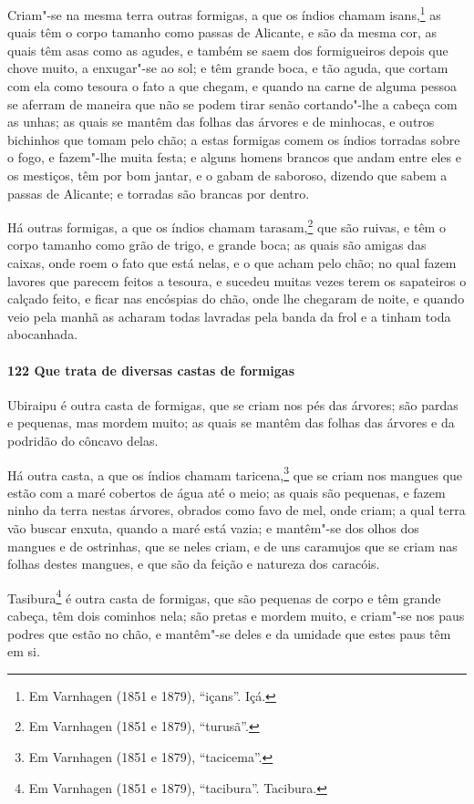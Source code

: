 \begin{linenumbers}
Criam"-se na mesma terra outras formigas, a que os índios chamam isans,\footnote{ Em
Varnhagen (1851 e 1879), ``içans''. Içá.} as quais têm o corpo tamanho como passas de
Alicante, e são da mesma cor, as quais têm asas como as agudes, e também se saem dos
formigueiros depois que chove muito, a enxugar"-se ao sol; e têm grande boca, e tão aguda,
que cortam com ela como tesoura o fato a que chegam, e quando na carne de alguma pessoa se
aferram de maneira que não se podem tirar senão cortando"-lhe a cabeça com as unhas; as
quais se mantêm das folhas das árvores e de minhocas, e outros bichinhos que tomam pelo
chão; a estas formigas comem os índios torradas sobre o fogo, e fazem"-lhe muita festa; e
alguns homens brancos que andam entre eles e os mestiços, têm por bom jantar, e o gabam de
saboroso, dizendo que sabem a passas de Alicante; e torradas são brancas por dentro.

Há outras formigas, a que os índios chamam tarasam,\footnote{ Em Varnhagen (1851 e 1879),
``turusã''.} que são ruivas, e têm o corpo tamanho como grão de trigo, e grande boca; as
quais são amigas das caixas, onde roem o fato que está nelas, e o que acham pelo chão; no
qual fazem lavores que parecem feitos a tesoura, e sucedeu muitas vezes terem os
sapateiros o calçado feito, e ficar nas encóspias do chão, onde lhe chegaram de noite, e
quando veio pela manhã as acharam todas lavradas pela banda da frol e a tinham toda
abocanhada.

\paragraph{122 Que trata de diversas castas de formigas}\quad
Ubiraipu é outra casta de formigas, que se criam nos pés das árvores; são pardas e
pequenas, mas mordem muito; as quais se mantêm das folhas das árvores e da podridão do
côncavo delas.

Há outra casta, a que os índios chamam taricena,\footnote{ Em Varnhagen (1851 e 1879),
``tacicema''.} que se criam nos mangues que estão com a maré cobertos de água até o meio;
as quais são pequenas, e fazem ninho da terra nestas árvores, obrados como favo de mel,
onde criam; a qual terra vão buscar enxuta, quando a maré está vazia; e mantêm"-se dos
olhos dos mangues e de ostrinhas, que se neles criam, e de uns caramujos que se criam nas
folhas destes mangues, e que são da feição e natureza dos caracóis.

Tasibura\footnote{ Em Varnhagen (1851 e 1879), ``tacibura''. Tacibura.} é outra casta de
formigas, que são pequenas de corpo e têm grande cabeça, têm dois cominhos nela; são
pretas e mordem muito, e criam"-se nos paus podres que estão no chão, e mantêm"-se deles e
da umidade que estes paus têm em si.


\end{linenumbers}
